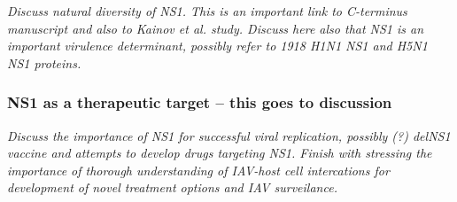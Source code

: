 		
		
		\textit{Discuss natural diversity of NS1. This is an important link to C-terminus manuscript and also to Kainov et al. study. Discuss here also that NS1 is an important virulence determinant, possibly refer to 1918 H1N1 NS1 and H5N1 NS1 proteins.}
		
		\subsubsection{NS1 as a therapeutic target -- this goes to discussion}
		
		\textit{Discuss the importance of NS1 for successful viral replication, possibly (?) delNS1 vaccine and attempts to develop drugs targeting NS1. Finish with stressing the importance of thorough understanding of IAV-host cell intercations for development of novel treatment options and IAV surveilance.}